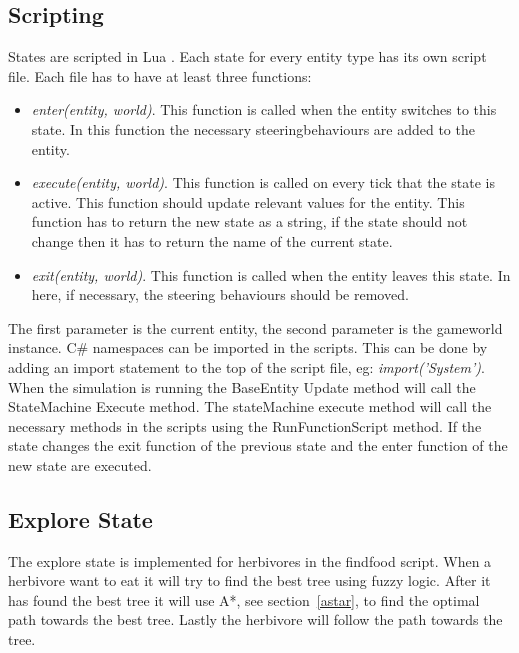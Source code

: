 \documentclass[10pt]{extarticle} %
\begin{document}
   \subsection {Scripting}
   States are scripted in Lua \cite{nlua}. Each state for every entity type has its own script file. Each file has to have at least three functions: 
   \begin{itemize}
   \item \emph{enter(entity, world)}. This function is called when the entity switches to this state. In this function the necessary steeringbehaviours are added to the entity.
   \item \emph{execute(entity, world)}. This function is called on every tick that the state is active. This function should update relevant values for the entity. This function has to return the new state as a string, if the state should not change then it has to return the name of the current state.
   \item \emph{exit(entity, world)}. This function is called when the entity leaves this state. In here, if necessary, the steering behaviours should be removed.
   \end{itemize}
   The first parameter is the current entity, the second parameter is the gameworld instance. C\# namespaces can be imported in the scripts. This can be done by adding an import statement to the top of the script file, eg: \emph{import('System')}.   
   When the simulation is running the BaseEntity Update method will call the StateMachine Execute method. The stateMachine execute method will call the necessary methods in the scripts using the RunFunctionScript method. If the state changes the exit function of the previous state and the enter function of the new state are executed.
   
   \subsection{Explore State} \label{state_explore}
   The explore state is implemented for herbivores in the findfood script. When a herbivore want to eat it will try to find the best tree using fuzzy logic. After it has found the best tree it will use A*, see section~\ref{astar}, to find the optimal path towards the best tree. Lastly the herbivore will follow the path towards the tree. 
   \newpage
\end{document}
